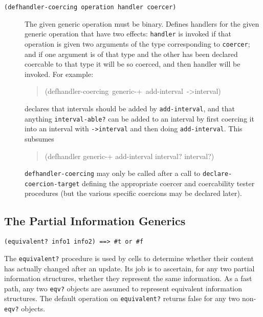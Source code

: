 \documentclass[12pt,letterpaper,english]{article}
\begin{document}
\begin{description}
\item[{\texttt{(defhandler-coercing operation handler coercer)}}] \leavevmode 
The given generic operation must be binary.  Defines handlers for
the given generic operation that have two effects: \texttt{handler} is
invoked if that operation is given two arguments of the type
corresponding to \texttt{coercer}; and if one argument is of that type
and the other has been declared coercable to that type it will be so
coerced, and then handler will be invoked.  For example:
\begin{quote}{\ttfamily \raggedright \noindent
(defhandler-coercing~generic-+~add-interval~->interval)
}\end{quote}
declares that intervals should be added by \texttt{add-interval}, and
that anything \texttt{interval-able?} can be added to an interval by
first coercing it into an interval with \texttt{->interval} and then
doing \texttt{add-interval}.  This subsumes
\begin{quote}{\ttfamily \raggedright \noindent
(defhandler generic-+ add-interval interval? interval?)
}\end{quote}

\texttt{defhandler-coercing} may only be called after a call to
\texttt{declare-coercion-target} defining the appropriate coercer and
coercability tester procedures (but the various specific coercions
may be declared later).

\end{description}



\hypertarget{the-partial-information-generics}{}
\subsection{The Partial Information Generics}
\label{the-partial-information-generics}

\texttt{(equivalent? info1 info2)  ==>  {\#}t or {\#}f}

The \texttt{equivalent?} procedure is used by cells to determine whether
their content has actually changed after an update.  Its job is to
ascertain, for any two partial information structures, whether they
represent the same information.  As a fast path, any two \texttt{eqv?}
objects are assumed to represent equivalent information structures.
The default operation on \texttt{equivalent?} returns false for any two
non-\texttt{eqv?} objects.
\end{document}
